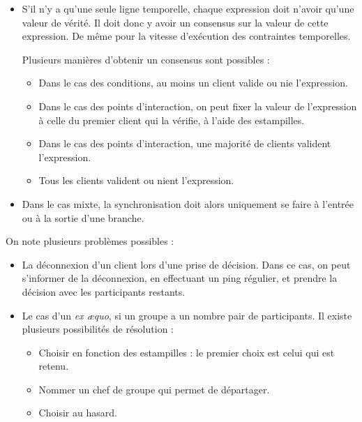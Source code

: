 \documentclass[10pt]{article}
\begin{document}
\begin{itemize}
	\item S'il n'y a qu'une seule ligne temporelle, chaque expression doit n'avoir qu'une valeur de vérité. 
    Il doit donc y avoir un consensus sur la valeur de cette expression. 
    De même pour la vitesse d'exécution des contraintes temporelles.
    
    Plusieurs manières d'obtenir un consensus sont possibles : 
    \begin{itemize}
        \item Dans le cas des conditions, au moins un client valide ou nie l'expression. 
        \item Dans le cas des points d'interaction, on peut fixer la valeur de l'expression à celle du premier client qui la vérifie, à l'aide des estampilles. %
        \item Dans le cas des points d'interaction, une majorité de clients valident l'expression.
        \item Tous les clients valident ou nient l'expression.
    \end{itemize}

	\item Dans le cas mixte, la synchronisation doit alors uniquement se faire à l'entrée ou à la sortie d'une branche.
\end{itemize}

On note plusieurs problèmes possibles : 
\begin{itemize}
    \item La déconnexion d'un client lors d'une prise de décision. 
    Dans ce cas, on peut s'informer de la déconnexion, en effectuant un ping régulier, et prendre la décision avec les participants restants. 
    \item Le cas d'un \textit{ex æquo}, si un groupe a un nombre pair de participants.
    Il existe plusieurs possibilités de résolution : 
    \begin{itemize}
        \item Choisir en fonction des estampilles : le premier choix est celui qui est retenu.
        \item Nommer un chef de groupe qui permet de départager.
        \item Choisir au hasard.
    \end{itemize}
\end{itemize}
\end{document}
